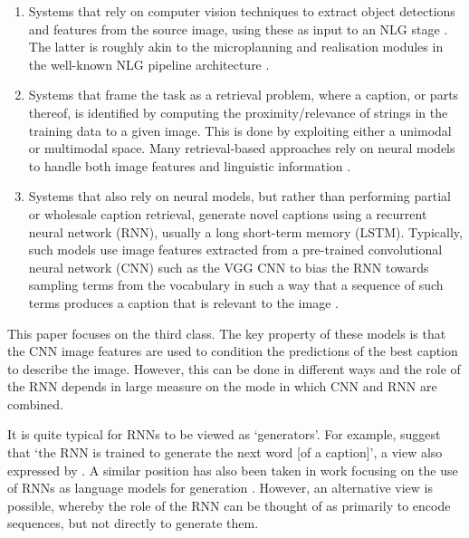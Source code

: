 \documentclass[11pt,letterpaper]{article}
\begin{document}
\begin{enumerate}
\item Systems that rely on computer vision techniques to extract object detections and features from the source image, using these as input to an NLG stage \cite{Kulkarni2011,Mitchell2012,Elliott2013}. The latter is roughly akin to the microplanning and realisation modules in the well-known NLG pipeline architecture  \cite{Reiter2000}.
\item Systems that frame the task as a retrieval problem, where a caption, or parts thereof, is identified by computing the proximity/relevance of strings in the training data to a given image. This is done by exploiting either a unimodal \cite{Ordonez2011,Gupta2012,Mason2014} or multimodal \cite{Hodosh2013,Socher2014} space. Many retrieval-based approaches rely on neural models to handle both image features and linguistic information \cite{Ordonez2011,Socher2014}.
\item Systems that also rely on neural models, but rather than performing partial or wholesale caption retrieval, generate novel captions using a recurrent neural network (RNN), usually a long short-term memory (LSTM). Typically, such models use image features extracted from a pre-trained convolutional neural network (CNN) such as the VGG CNN \cite{Simonyan2014} to bias the RNN towards sampling terms from the vocabulary in such a way that a sequence of such terms produces a caption that is relevant to the image \cite{Kiros2014,Kiros2014a,Vinyals2015,Mao2015,Hendricks2016}.
\end{enumerate}

This paper focuses on the third class. The key property of these models is that the CNN image features are used to condition the predictions of the best caption to describe the image. However, this can be done in different ways and the role of the RNN depends in large measure on the mode in which CNN and RNN are combined.

It is quite typical for RNNs to be viewed as `generators'. For example,  suggest that `the RNN is trained to generate the next word [of a caption]', a view also expressed by . A similar position has also been taken in work focusing on the use of RNNs as language models for generation \cite{Sutskever2011,Graves2013}. 
However, an alternative view is possible, whereby the role of the RNN can be thought of as primarily to encode sequences, but not directly to generate them.
\end{document}
